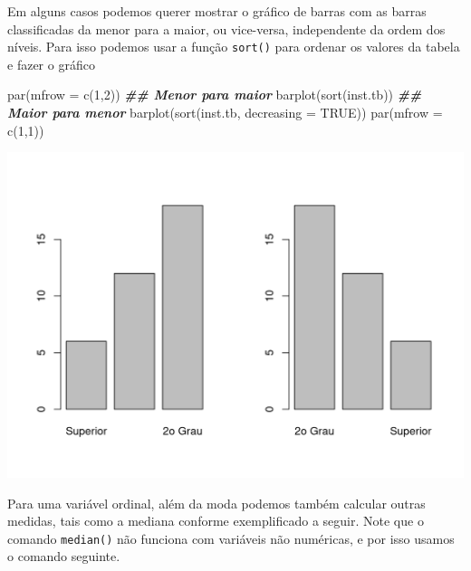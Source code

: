 \documentclass[
  10pt,
  a4paper]{book}
\newenvironment{Shaded}{\begin{snugshade}}{\end{snugshade}}
\newcommand{\AttributeTok}[1]{\textcolor[rgb]{0.77,0.63,0.00}{#1}}
\newcommand{\ConstantTok}[1]{\textcolor[rgb]{0.00,0.00,0.00}{#1}}
\newcommand{\DecValTok}[1]{\textcolor[rgb]{0.00,0.00,0.81}{#1}}
\newcommand{\DocumentationTok}[1]{\textcolor[rgb]{0.56,0.35,0.01}{\textbf{\textit{#1}}}}
\newcommand{\FunctionTok}[1]{\textcolor[rgb]{0.00,0.00,0.00}{#1}}
\newcommand{\NormalTok}[1]{#1}
\begin{document}
Em alguns casos podemos querer mostrar o gráfico de barras com as barras
classificadas da menor para a maior, ou vice-versa, independente da
ordem dos níveis. Para isso podemos usar a função \texttt{sort()} para ordenar
os valores da tabela e fazer o gráfico

\begin{Shaded}
\begin{Highlighting}[]
\FunctionTok{par}\NormalTok{(}\AttributeTok{mfrow =} \FunctionTok{c}\NormalTok{(}\DecValTok{1}\NormalTok{,}\DecValTok{2}\NormalTok{))}
\DocumentationTok{\#\# Menor para maior}
\FunctionTok{barplot}\NormalTok{(}\FunctionTok{sort}\NormalTok{(inst.tb))}
\DocumentationTok{\#\# Maior para menor}
\FunctionTok{barplot}\NormalTok{(}\FunctionTok{sort}\NormalTok{(inst.tb, }\AttributeTok{decreasing =} \ConstantTok{TRUE}\NormalTok{))}
\FunctionTok{par}\NormalTok{(}\AttributeTok{mfrow =} \FunctionTok{c}\NormalTok{(}\DecValTok{1}\NormalTok{,}\DecValTok{1}\NormalTok{))}
\end{Highlighting}
\end{Shaded}

\begin{center}\includegraphics{figures/unnamed-chunk-297-1} \end{center}

Para uma variável ordinal, além da moda podemos também calcular outras
medidas, tais como a mediana conforme exemplificado a seguir. Note que
o comando \texttt{median()} não funciona com variáveis não numéricas, e por
isso usamos o comando seguinte.
\end{document}
